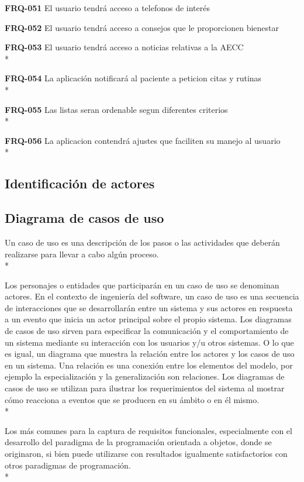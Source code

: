 \documentclass[../pfc.tex]{subfiles}
\begin{document}
	\textbf{FRQ-051}	El usuario tendrá acceso a telefonos de interés
	
	\textbf{FRQ-052}	El usuario tendrá acceso a consejos que le proporcionen bienestar
	
	\textbf{FRQ-053}	El usuario tendrá acceso a noticias relativas a la AECC\\*
	
	\textbf{FRQ-054}	La aplicación notificará al paciente a peticion citas y rutinas\\*
	
	\textbf{FRQ-055}	Las listas seran ordenable segun diferentes criterios\\*
	
	\textbf{FRQ-056}	La aplicacion contendrá ajustes que faciliten su manejo al usuario\\*
	

		

	\subsection{Identificación de actores}
		
	\subsection{Diagrama de casos de uso }
		
	Un caso de uso es una descripción de los pasos o las actividades que deberán realizarse para llevar a cabo algún proceso.\\*
	
	Los personajes o entidades que participarán en un caso de uso se denominan actores. En el contexto de ingeniería del software, un caso de uso es una secuencia de interacciones que se desarrollarán entre un sistema y sus actores en respuesta a un evento que inicia un actor principal sobre el propio sistema. Los diagramas de casos de uso sirven para especificar la comunicación y el comportamiento de un sistema mediante su interacción con los usuarios y/u otros sistemas. O lo que es igual, un diagrama que muestra la relación entre los actores y los casos de uso en un sistema. Una relación es una conexión entre los elementos del modelo, por ejemplo la especialización y la generalización son relaciones. Los diagramas de casos de uso se utilizan para ilustrar los requerimientos del sistema al mostrar cómo reacciona a eventos que se producen en su ámbito o en él mismo.\\*
	
	Los más comunes para la captura de requisitos funcionales, especialmente con el desarrollo del paradigma de la programación orientada a objetos, donde se originaron, si bien puede utilizarse con resultados igualmente satisfactorios con otros paradigmas de programación.\\*
	
\end{document}
